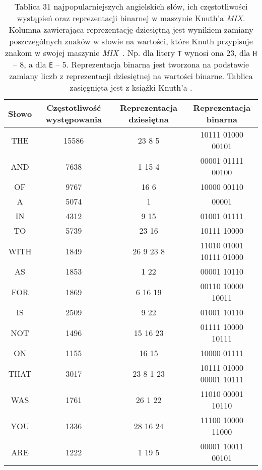 	\begin{table}
		\centering
		\begin{threeparttable}
			\caption{Tablica 31 najpopularniejszych angielskich słów, ich częstotliwości wystąpień oraz reprezentacji binarnej w maszynie Knuth'a \emph{MIX}. Kolumna zawierająca reprezentację dziesiętną jest wynikiem zamiany poszczególnych znaków w słowie na wartości, które Knuth przypisuje znakom w swojej maszynie \emph{MIX}~\cite{wikiMix}. Np. dla litery \texttt{T} wynosi ona 23, dla \texttt{H} -- 8, a dla \texttt{E} -- 5. Reprezentacja binarna jest tworzona na podstawie zamiany liczb z reprezentacji dziesiętnej na wartości binarne. Tablica zasięgnięta jest z książki Knuth'a \cite{KnuthsTheArtOfComputerProgramming3}.}\label{tab:MixBitReprezentationFor31MostCommonEnglishWords}
			
			{ \small
				\begin{tabularx}{0.86\textwidth}{C{3}|C{6}|C{6}|C{14}|}
					\textbf{Słowo} & \textbf{Częstotliwość występowania} & \textbf{Reprezentacja dziesiętna} & \textbf{Reprezentacja binarna} \\
					\hline \hline
					THE 	& 15586 	& 23 8 5 		& 10111 01000 00101 \\
					AND 	& 7638 		& 1 15 4 		& 00001 01111 00100 \\
					OF 		& 9767		& 16 6 			& 10000 00110 \\
					A 		& 5074 		& 1 			& 00001 \\
					IN 		& 4312 		& 9 15 			& 01001 01111 \\
					TO 		& 5739 		& 23 16 		& 10111 10000 \\
					WITH 	& 1849 		& 26 9 23 8 	& 11010 01001 10111 01000 \\
					AS 		& 1853 		& 1 22 			& 00001 10110 \\
					FOR 	& 1869 		& 6 16 19 		& 00110 10000 10011 \\
					IS 		& 2509 		& 9 22 			& 01001 10110 \\
					NOT 	& 1496 		& 15 16 23 		& 01111 10000 10111 \\
					ON 		& 1155 		& 16 15 		& 10000 01111 \\
					THAT 	& 3017 		& 23 8 1 23 	& 10111 01000 00001 10111 \\
					WAS 	& 1761 		& 26 1 22 		& 11010 00001 10110 \\
					YOU 	& 1336 		& 28 16 24 		& 11100 10000 11000 \\
					ARE 	& 1222 		& 1 19 5 		& 00001 10011 00101 \\

\end{tabularx}}
\end{threeparttable}
\end{table}
